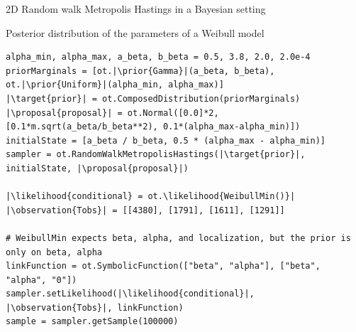 \documentclass{beamer}
\newcommand{\target}[1]{\textcolor{red}{#1}}
\newcommand{\proposal}[1]{\textcolor{blue}{#1}}
\newcommand{\prior}[1]{\textcolor{red}{#1}}
\newcommand{\likelihood}[1]{\textcolor{green}{#1}}
\newcommand{\observation}[1]{\textcolor{orange}{#1}}
\begin{document}
\begin{frame}[containsverbatim]{2D Random walk Metropolis Hastings in a Bayesian setting}
\begin{block}{Posterior distribution of the parameters of a Weibull model}
\begin{lstlisting}
alpha_min, alpha_max, a_beta, b_beta = 0.5, 3.8, 2.0, 2.0e-4
priorMarginals = [ot.|\prior{Gamma}|(a_beta, b_beta), ot.|\prior{Uniform}|(alpha_min, alpha_max)]
|\target{prior}| = ot.ComposedDistribution(priorMarginals)
|\proposal{proposal}| = ot.Normal([0.0]*2, [0.1*m.sqrt(a_beta/b_beta**2), 0.1*(alpha_max-alpha_min)])
initialState = [a_beta / b_beta, 0.5 * (alpha_max - alpha_min)]
sampler = ot.RandomWalkMetropolisHastings(|\target{prior}|, initialState, |\proposal{proposal}|)

|\likelihood{conditional} = ot.\likelihood{WeibullMin()}|
|\observation{Tobs}| = [[4380], [1791], [1611], [1291]]

# WeibullMin expects beta, alpha, and localization, but the prior is only on beta, alpha
linkFunction = ot.SymbolicFunction(["beta", "alpha"], ["beta", "alpha", "0"])
sampler.setLikelihood(|\likelihood{conditional}|, |\observation{Tobs}|, linkFunction)
sample = sampler.getSample(100000)
\end{lstlisting}
\end{block}
\end{frame}


\end{document}
